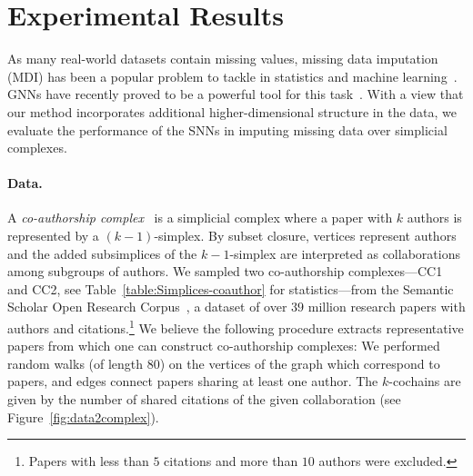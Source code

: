 \section{Experimental Results}

As many real-world datasets contain missing values, missing data imputation (MDI) has been a popular problem to tackle in statistics and machine learning~\cite{little1986statistical, nelwamondo2007missing}.
GNNs have recently proved to be a powerful tool for this task~\cite{spinelli2020neural}.
With a view that our method incorporates additional higher-dimensional structure in the data, we evaluate the performance of the SNNs in imputing missing data over simplicial complexes.

\paragraph{Data.}
A \emph{co-authorship complex}~\cite{patania2017} is a simplicial complex where a paper with $k$ authors is represented by a $(k-1)$-simplex.
By subset closure, vertices represent authors and the added subsimplices of the $k-1$-simplex are interpreted as collaborations among subgroups of authors. We sampled two co-authorship complexes---CC1 and CC2, see Table~\ref{table:Simplices-coauthor} for statistics---from the Semantic Scholar Open Research Corpus~\cite{ammar18NAACL}, a dataset of over $39$ million research papers with authors and citations.\footnote{Papers with less than $5$ citations and more than $10$ authors were excluded.}
We believe the following procedure extracts representative papers from which one can construct co-authorship complexes: We performed random walks (of length $80$) on the vertices of the graph which correspond to papers, and edges connect papers sharing at least one author. 
The $k$-cochains are given by the number of shared citations of the given collaboration (see Figure~\ref{fig:data2complex}).

